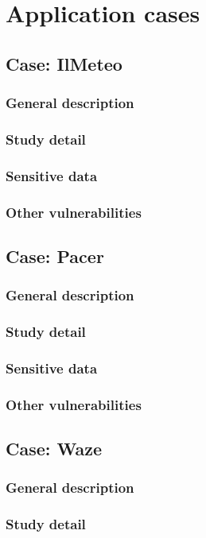 \chapter{Application cases}
	\section{Case: IlMeteo}
		\subsection{General description}
		\subsection{Study detail}
		\subsection{Sensitive data}
		\subsection{Other vulnerabilities}

	\section{Case: Pacer}
		\subsection{General description}
		\subsection{Study detail}
		\subsection{Sensitive data}
		\subsection{Other vulnerabilities}

	\section{Case: Waze}
		\subsection{General description}
		\subsection{Study detail}
